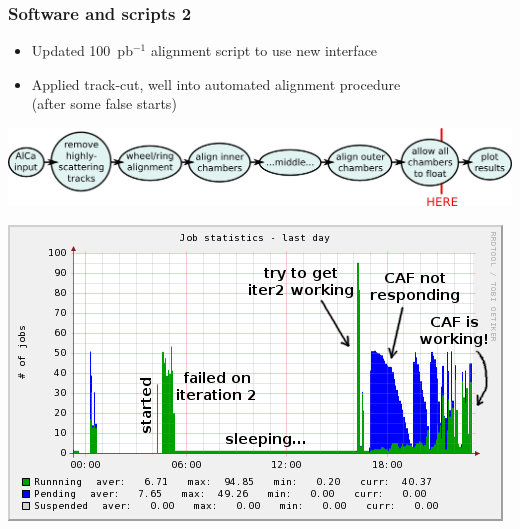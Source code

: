 \documentclass[compress]{beamer}
\begin{document}
\begin{frame}
\frametitle{Software and scripts 2}

\small
\begin{itemize}\setlength{\itemsep}{0.2 cm}
\item Updated 100~pb$^{-1}$ alignment script to use new interface
\item Applied track-cut, well into automated alignment procedure \\ (after some false starts)
\end{itemize}
\includegraphics[width=\linewidth]{drawing.png}

\begin{center}
\includegraphics[width=0.6\linewidth]{cafplot.png}
\end{center}
\end{frame}
\end{document}
